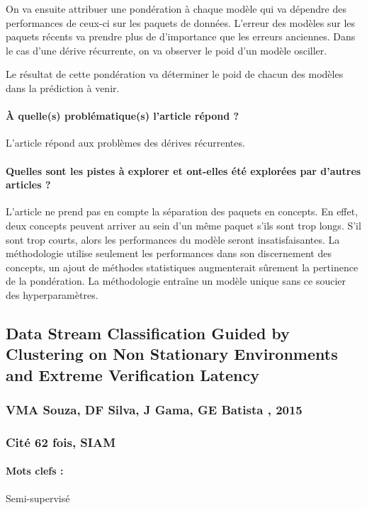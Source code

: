 \documentclass[11pt,a4paper]{report}
\begin{document}
On va ensuite attribuer une pondération à chaque modèle qui va dépendre des performances de ceux-ci sur les paquets de données. L'erreur des modèles sur les paquets récents va prendre plus de d'importance que les erreurs anciennes. Dans le cas d'une dérive récurrente, on va observer le poid d'un modèle osciller.

Le résultat de cette pondération va déterminer le poid de chacun des modèles dans la prédiction à venir.


\paragraph{À quelle(s) problématique(s) l'article répond ?} L'article répond aux problèmes des dérives récurrentes.

\paragraph{Quelles sont les pistes à explorer et ont-elles été explorées par d'autres articles ?} L'article ne prend pas en compte la séparation des paquets en concepts. En effet, deux concepts peuvent arriver au sein d'un même paquet s'ils sont trop longs. S'il sont trop courts, alors les performances du modèle seront insatisfaisantes. La méthodologie utilise seulement les performances dans son discernement des concepts, un ajout de méthodes statistiques augmenterait sûrement la pertinence de la pondération. La méthodologie entraîne un modèle unique sans ce soucier des hyperparamètres.




\subsection{Data Stream Classification Guided by Clustering on Non Stationary Environments and Extreme Verification Latency}
\subsubsection{VMA Souza, DF Silva, J Gama, GE Batista , 2015}
\subsubsection{Cité 62 fois, SIAM}

\paragraph{Mots clefs :} Semi-supervisé
\end{document}
